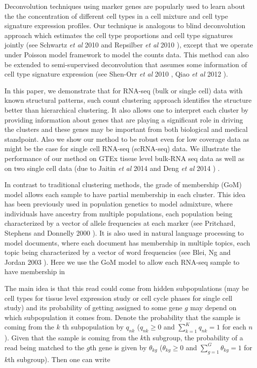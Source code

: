 Deconvolution techniques using marker genes are popularly used to learn about the the concentration of different cell types in a cell mixture and cell type signature expression profiles. Our technique is analogous to blind deconvolution approach which estimates the cell type proportions and cell type signatures jointly (see Schwartz \textit{et al} 2010 \cite{Schwartz2010} and Repsilber \textit{et al} 2010 \cite{Repsilber2010}), except that we operate under Poisson model framework to model the counts data. This method can also be extended to semi-supervised deconvolution that assumes some information of cell type signature expression (see Shen-Orr \textit{et al} 2010 \cite{Shen-Orr2010},  Qiao \textit{et al} 2012 \cite{Qiao2012}). 

In this paper, we demonstrate that for RNA-seq (bulk or single cell) data with known structural patterns, such count clustering approach identifies the structure better than hierarchical clustering. It also allows one to interpret each cluster by providing information about genes that are playing a significant role in driving the clusters and these genes may be important from both biological and medical standpoint. Also we show our method to be robust even for low coverage data as might be the case for single cell RNA-seq (scRNA-seq) data.
We illustrate the performance of our method on GTEx tissue level  bulk-RNA seq data as well as on two single cell data (due to Jaitin \textit{et al} 2014 \cite{Jaitin2014} and Deng \textit{et al} 2014 \cite{Deng2014}) . 


In contrast to traditional clustering methods, the grade of membership (GoM) model allows each sample to have partial membership in each cluster. This idea has been previously used in population genetics to model admixture, where individuals have ancestry from multiple populations, each population being characterized by a vector of allele frequencies at each marker (see Pritchard, Stephens and Donnelly 2000 \cite{Pritchard2000}). It is also used in natural language processing to model documents, where each document has membership in multiple topics, each topic being characterized by a vector of word frequencies (see Blei, Ng and Jordan 2003 \cite{Blei2003}). Here we use the GoM model to allow each RNA-seq sample to have membership in 

The main idea is that this read could come from hidden subpopulations (may be cell types for tissue level expression study or cell cycle phases for single cell study) and its probability of getting assigned to some gene $g$ may depend on which subpopulation it comes from. Denote  the probability that the sample is coming from the $k$ th subpopulation by $q_{nk}$ ($q_{nk} \geq 0$ and $\sum_{k=1}^{K} q_{nk} =1$ for each $n$).  Given that the sample is coming from the $k$th subgroup, the probability of a read being matched to the $g$th gene is given by $\theta_{kg}$ ($\theta_{kg} \geq 0$ and $\sum_{g=1}^{G} \theta_{kg} =1$ for $k$th subgroup). Then one can write 



